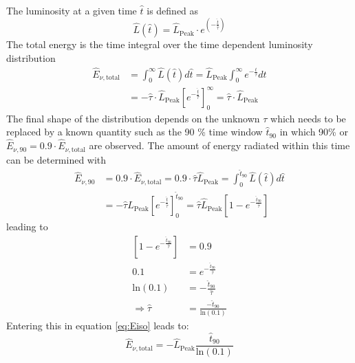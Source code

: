 
The luminosity at a given time $\hat{t}$ is defined as 
\begin{equation}
 \hat{L}(\hat{t}) = \hat{L}_{\text{Peak}} \cdot e^{\left(-
\frac{\hat{t}}{\hat{\tau}}\right)}
\label{eq:lum_vs_time}
\end{equation}
The total energy is the time integral over the time dependent luminosity
distribution
\begin{equation}
\label{eq:Eiso}
\begin{align}
 \hat{E}_{\nu, \text{total}} & =  \int_0^{\infty} \hat{L}(\hat{t}) d\hat{t} 
	  =  \hat{L}_{\text{Peak}} \int_0^{\infty} e^{-\frac{t}{\tau}} dt\\
	 & = - \hat{\tau} \cdot \hat{L}_{\text{Peak}} \left[
e^{-\frac{\hat{t}}{\hat{\tau}}}
\right]_0^{\infty}
          = \hat{\tau} \cdot \hat{L}_{\text{Peak}}
\end{align}
\end{equation}
The final shape of the distribution depends on the unknown $\tau$ which needs to
be replaced by a known quantity such as the 90 \% time window
$\hat{t}_{90}$ in which 90\% or $\hat{E}_{\nu, 90}=0.9 \cdot \hat{E}_{\nu,
\text{total}}$ are
observed. 
The amount of energy radiated within this time can be determined with
\begin{equation}
 \begin{align}
  \hat{E}_{\nu, 90} & = 0.9 \cdot \hat{E}_{\nu, \text{total}} = 0.9 \cdot
\hat{\tau} \hat{L}_{\text{Peak}} = 
\int_0^{\hat{t}_{90}} \hat{L}(\hat{t}) d\hat{t} \\
         & = - \hat{\tau} \hat{L}_{\text{Peak}}
\left[e^{-\frac{\hat{t}}{\hat{\tau}}} \right]_0^{\hat{t}_{90}}
= \hat{\tau} \hat{L}_{\text{Peak}} \left[1 -
e^{-\frac{\hat{t}_{90}}{\hat{\tau}}} \right]
 \end{align}
\end{equation}
leading to 
\begin{equation}
 \begin{align}
  \left[ 1 - e^{-\frac{\hat{t}_{90}}{\hat{\tau}}} \right] &= 0.9 \\
 0.1 & = e^{-\frac{\hat{t}_{90}}{\hat{\tau}}} \\
 \text{ln}(0.1) & = -\frac{\hat{t}_{90}}{\hat{\tau}}\\
 \Rightarrow \hat{\tau} &= \frac{-\hat{t}_{90}}{\text{ln}(0.1)}
 \label{eq:ToyMC_tau}
 \end{align}
\end{equation}
Entering this in equation \ref{eq:Eiso} leads to:
\begin{equation}
 \hat{E}_{\nu, \text{total}} = - \hat{L}_{\text{Peak}}
\frac{\hat{t}_{90}}{\text{ln}(0.1)}
\end{equation}


